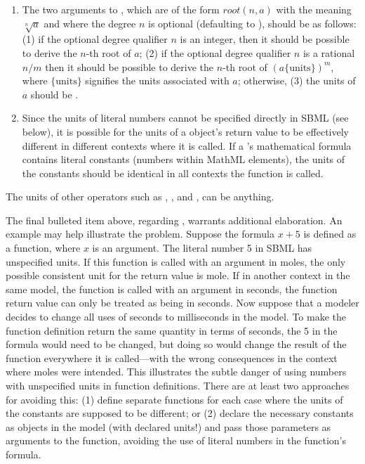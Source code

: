 \begin{enumerate}
\item The two arguments to , which are of the form
  $\textit{root}(n,a)$ with the meaning $\sqrt[n]{a}$ and where
  the degree $n$ is optional (defaulting to ), should be as
  follows: (1) if the optional degree qualifier $n$ is an integer,
  then it should be possible to derive the $n$-th root of $a$; (2)
  if the optional degree qualifier $n$ is a rational $n/m$ then it
  should be possible to derive the $n$-th root of $(a
  \{\text{units}\})^m$, where $\{\text{units}\}$ signifies the
  units associated with $a$; otherwise, (3) the units of $a$ should
  be .

\item Since the units of literal numbers cannot be specified
  directly in SBML (see below), it is possible for the units of a
  \FunctionDefinition object's return value to be effectively
  different in different contexts where it is called.  If a
  \FunctionDefinition's mathematical formula contains literal
  constants (\ie numbers within MathML  elements), the
  units of the constants should be identical in all contexts the
  function is called.

\end{enumerate}

The units of other operators such as , ,
and , can be anything.

The final bulleted item above, regarding \FunctionDefinition,
warrants additional elaboration.  An example may help illustrate
the problem.  Suppose the formula $x + 5$ is defined as a
function, where $x$ is an argument.  The literal number 5 in SBML
has unspecified units.  If this function is called with an
argument in moles, the only possible consistent unit for the
return value is mole.  If in another context in the same model,
the function is called with an argument in seconds, the function
return value can only be treated as being in seconds.  Now suppose
that a modeler decides to change all uses of seconds to
milliseconds in the model.  To make the function definition return
the same quantity in terms of seconds, the 5 in the formula would
need to be changed, but doing so would change the result of the
function everywhere it is called---with the wrong consequences in
the context where moles were intended.  This illustrates the
subtle danger of using numbers with unspecified units in function
definitions.  There are at least two approaches for avoiding this:
(1) define separate functions for each case where the units of the
constants are supposed to be different; or (2) declare the
necessary constants as \Parameter objects in the model (with
declared units!) and pass those parameters as arguments to the
function, avoiding the use of literal numbers in the function's
formula.


